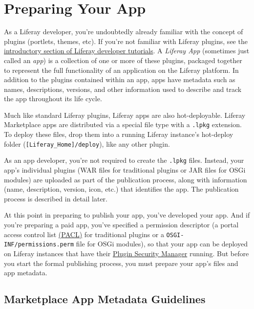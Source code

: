 \section{Preparing Your App}\label{preparing-your-app}

As a Liferay developer, you're undoubtedly already familiar with the
concept of plugins (portlets, themes, etc). If you're not familiar with
Liferay plugins, see the
\href{/docs/7-0/tutorials/-/knowledge_base/t/introduction-to-liferay-development}{introductory
section of Liferay developer tutorials}. A \emph{Liferay App} (sometimes
just called an \emph{app}) is a collection of one or more of these
plugins, packaged together to represent the full functionality of an
application on the Liferay platform. In addition to the plugins
contained within an app, apps have metadata such as names, descriptions,
versions, and other information used to describe and track the app
throughout its life cycle.

Much like standard Liferay plugins, Liferay apps are also
hot-deployable. Liferay Marketplace apps are distributed via a special
file type with a \texttt{.lpkg} extension. To deploy these files, drop
them into a running Liferay instance's hot-deploy folder
(\texttt{{[}Liferay\_Home{]}/deploy}), like any other plugin.

As an app developer, you're not required to create the \texttt{.lpkg}
files. Instead, your app's individual plugins (WAR files for traditional
plugins or JAR files for OSGi modules) are uploaded as part of the
publication process, along with information (name, description, version,
icon, etc.) that identifies the app. The publication process is
described in detail later.

At this point in preparing to publish your app, you've developed your
app. And if you're preparing a paid app, you've specified a permission
descriptor (a portal access control list
\href{/docs/6-2/tutorials/-/knowledge_base/t/plugin-security-and-pacl}{(PACL)}
for traditional plugins or a \texttt{OSGI-INF/permissions.perm} file for
OSGi modules), so that your app can be deployed on Liferay instances
that have their
\href{/docs/6-2/tutorials/-/knowledge_base/t/plugin-security-and-pacl\#enabling-the-security-manager}{Plugin
Security Manager} running. But before you start the formal publishing
process, you must prepare your app's files and app metadata.

\subsection{Marketplace App Metadata
Guidelines}\label{marketplace-app-metadata-guidelines}

